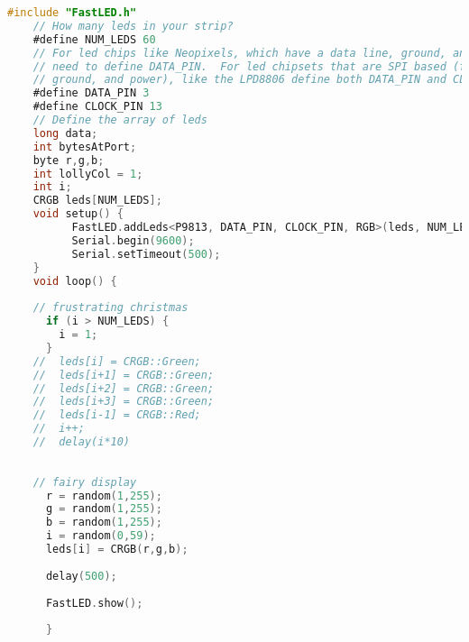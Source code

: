 \begin{lstlisting}[language=C, caption=Arduino code that randomaly changes the clour of each RGB.,  label=list:arduinoCode2]
    #include "FastLED.h"
    // How many leds in your strip?
    #define NUM_LEDS 60
    // For led chips like Neopixels, which have a data line, ground, and power, you just
    // need to define DATA_PIN.  For led chipsets that are SPI based (four wires - data, clock,
    // ground, and power), like the LPD8806 define both DATA_PIN and CLOCK_PIN
    #define DATA_PIN 3
    #define CLOCK_PIN 13
    // Define the array of leds
    long data;
    int bytesAtPort;
    byte r,g,b;
    int lollyCol = 1;
    int i;
    CRGB leds[NUM_LEDS];
    void setup() { 
          FastLED.addLeds<P9813, DATA_PIN, CLOCK_PIN, RGB>(leds, NUM_LEDS);
          Serial.begin(9600);
          Serial.setTimeout(500);
    }
    void loop() { 
      
    // frustrating christmas
      if (i > NUM_LEDS) {
        i = 1;
      }
    //  leds[i] = CRGB::Green;
    //  leds[i+1] = CRGB::Green;
    //  leds[i+2] = CRGB::Green;
    //  leds[i+3] = CRGB::Green;
    //  leds[i-1] = CRGB::Red;
    //  i++;
    //  delay(i*10)
    
      
    // fairy display
      r = random(1,255);
      g = random(1,255);
      b = random(1,255);
      i = random(0,59);
      leds[i] = CRGB(r,g,b);
    
      delay(500);
      
      FastLED.show();
      
      }
    
\end{lstlisting}